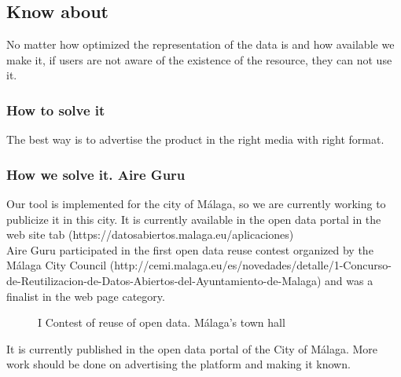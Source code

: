 \subsection{Know about}

No matter how optimized the representation of the data is and how available we make it, if users are not aware
 of the existence of the resource, they can not use it.

\subsubsection{How to solve it} 
The best way is to advertise the product in the right media with right format.
\subsubsection{How we solve it. Aire Guru} 
Our tool is implemented for the city of Málaga, so we are currently working to publicize it in this city.
It is currently available in the open data portal in the web site tab (https://datosabiertos.malaga.eu/aplicaciones) \\
Aire Guru participated in the first open data reuse contest organized by the Málaga City Council (http://cemi.malaga.eu/es/novedades/detalle/1-Concurso-de-Reutilizacion-de-Datos-Abiertos-del-Ayuntamiento-de-Malaga)
and was a finalist in the web page category.


\begin{figure}[ht]
    \centering
   \hfill
 
    \caption{I Contest of reuse of open data. Málaga's town hall}
    \end{figure}

\begin{itemize}
    \done It is currently published in the open data portal of the City of Málaga.
\crossed More work should be done on advertising the platform and making it known.
\end{itemize}
\newpage